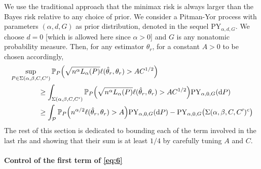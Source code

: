 \documentclass{article}
\newcommand{\1}{\boldsymbol{1}}
\newcommand{\PP}{\mathbb{P}}
\theoremstyle{plain}
\begin{document}
We use the traditional approach that the minimax risk is always larger than the Bayes risk relative to any choice of prior. We consider a Pitman-Yor process \cite[Section~14.4]{Gho(17)} with parameters $(\alpha,d,G)$ as prior distribution, denoted in the sequel $\mathrm{PY}_{\alpha,d,G}$. We choose $d = 0$ [which is allowed here since $\alpha > 0$] and $G$ is any nonatomic probability measure. Then, for any estimator $\hat{\theta}_r$, for a constant $A>0$ to be chosen accordingly,
\begin{align}
  \notag
  &\sup_{P\in \Sigma(\alpha,\beta,C,C')}\PP_P\Big( \sqrt{n^{\alpha}L_{\alpha}(P)} \ell(\hat{\theta}_r,\theta_r) > AC^{1/2} \Big)\\%
  \notag
  &\qquad\qquad\geq \int_{\Sigma(\alpha,\beta,C,C')}\PP_P\Big( \sqrt{n^{\alpha}L_{\alpha}(P)} \ell(\hat{\theta}_r,\theta_r) > AC^{1/2} \Big) \mathrm{PY}_{\alpha,0,G}(\intd P)\\
  &\qquad\qquad\geq \int_{\mathcal{P}}\PP_P\Big(n^{\alpha/2}\ell(\hat{\theta}_r,\theta_r) > A \Big) \mathrm{PY}_{\alpha,0,G}(\intd P)%
    - \mathrm{PY}_{\alpha,0,G}\big( \Sigma(\alpha,\beta,C,C')^c \big)
        \label{eq:6}
\end{align}
The rest of this section is dedicated to bounding each of the term involved in the last rhs and showing that their sum is at least $1/4$ by carefully tuning $A$ and $C$.


\paragraph{Control of the first term of \eqref{eq:6}}
\end{document}
